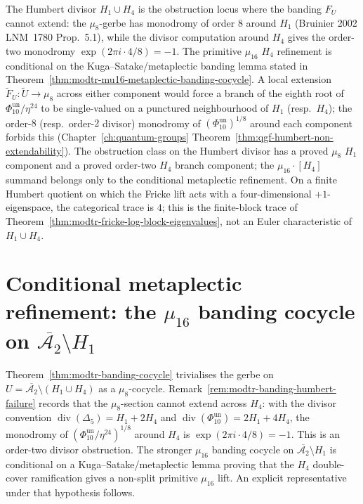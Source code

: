 \begin{remark}
\label{rem:modtr-banding-humbert-failure}
The Humbert divisor $H_1\cup H_4$ is the obstruction locus where the
banding $F_U$ cannot extend: the $\mu_8$-gerbe has monodromy of order
$8$ around $H_1$ (Bruinier 2002 LNM~1780 Prop.~5.1), while the divisor
computation around $H_4$ gives the order-two monodromy
$\exp(2\pi i\cdot4/8)=-1$. The primitive $\mu_{16}$ $H_4$ refinement is
conditional on the Kuga--Satake/metaplectic banding lemma stated in
Theorem~\ref{thm:modtr-mu16-metaplectic-banding-cocycle}. A local
extension
$\widetilde F_U\colon\widetilde U\to\mu_8$ across either component would
force a branch of the eighth root of $\Phi_{10}^{\mathrm{un}}/\eta^{24}$ to be
single-valued on a punctured neighbourhood of
$H_1$ (resp.\ $H_4$); the order-$8$ (resp.\ order-$2$ divisor) monodromy of
$(\Phi_{10}^{\mathrm{un}})^{1/8}$ around each component forbids this
(Chapter~\ref{ch:quantum-groups}
Theorem~\ref{thm:qgf-humbert-non-extendability}).
The obstruction class on the Humbert divisor has a proved $\mu_8$
$H_1$ component and a proved order-two $H_4$ branch component; the
$\mu_{16}\cdot[H_4]$ summand belongs only to the conditional metaplectic
refinement. On a finite Humbert quotient on which the Fricke lift acts
with a four-dimensional \(+1\)-eigenspace, the categorical trace is
\(4\); this is the finite-block trace of
Theorem~\ref{thm:modtr-fricke-log-block-eigenvalues}, not an Euler
characteristic of \(H_1\cup H_4\).
\end{remark}

\section{Conditional metaplectic refinement: the \texorpdfstring{$\mu_{16}$}{mu-16} banding cocycle on \texorpdfstring{$\overline{\mathcal A_2}\setminus H_1$}{overlineA-2setminus H-1}}
\label{sec:modtr-mu16-metaplectic-banding}

Theorem~\ref{thm:modtr-banding-cocycle} trivialises the gerbe on
$U = \overline{\mathcal A_2}\setminus(H_1\cup H_4)$ as a $\mu_8$-cocycle.
Remark~\ref{rem:modtr-banding-humbert-failure} records that the
$\mu_8$-section cannot extend across $H_4$: with the divisor convention
$\operatorname{div}(\Delta_5)=H_1+2H_4$ and
$\operatorname{div}(\Phi_{10}^{\mathrm{un}})=2H_1+4H_4$, the monodromy of
$(\Phi_{10}^{\mathrm{un}}/\eta^{24})^{1/8}$ around $H_4$ is
$\exp(2\pi i\cdot4/8)=-1$. This is an order-two divisor obstruction.
The stronger $\mu_{16}$ banding cocycle on
$\overline{\mathcal A_2}\setminus H_1$ is conditional on a
Kuga--Satake/metaplectic lemma proving that the $H_4$ double-cover
ramification gives a non-split primitive $\mu_{16}$ lift. An explicit
representative under that hypothesis follows.

